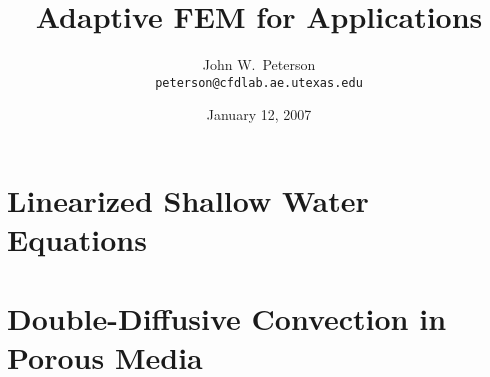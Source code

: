 \documentclass[
  compress
  ,12pt
]{beamer}
\title{Adaptive FEM for Applications}
\author{John W.\ Peterson \\ \texttt{\tiny peterson@cfdlab.ae.utexas.edu}}
\institute[UT-Austin]{Univ.\ of Texas at Austin}
\date{January 12, 2007}
\begin{document}
  
\begin{frame}
  \titlepage
\end{frame}


\section{Linearized Shallow Water Equations}









\section{Double-Diffusive Convection in Porous Media} 




\end{document}

